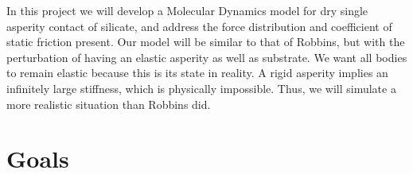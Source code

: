 \documentclass[twoside,english]{uiofysmaster}
\begin{document}
In this project we will develop a Molecular Dynamics model for dry single asperity contact of silicate, and address the force distribution and coefficient of static friction present.
Our model will be similar to that of Robbins, but with the perturbation of having an elastic asperity as well as substrate.
We want all bodies to remain elastic because this is its state in reality. 
A rigid asperity implies an infinitely large stiffness, which is physically impossible. 
Thus, we will simulate a more realistic situation than Robbins did.

 
\newpage
\section{Goals}
\end{document}
